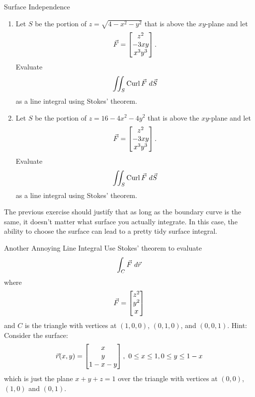 \begin{exercise}{Surface Independence}
\begin{enumerate}
\item Let $S$ be the portion of $z=\sqrt{4-x^2-y^2} $ that is above the $xy$-plane and let $$\vec{F}=\begin{bmatrix}z^2\\-3xy\\x^3y^3\end{bmatrix}.$$ Evaluate $$\iint_S \operatorname{Curl}\vec{F} \ d\vec{S} $$ as a line integral using Stokes' theorem.
\vspace{1em}
\item Let $S$ be the portion of $z=16-4x^2-4y^2 $ that is above the $xy$-plane and let $$\vec{F}=\begin{bmatrix}z^2\\-3xy\\x^3y^3\end{bmatrix}.$$ Evaluate $$\iint_S \operatorname{Curl}\vec{F} \ d\vec{S} $$ as a line integral using Stokes' theorem.
\end{enumerate}
\end{exercise}

The previous exercise should justify that as long as the boundary curve is the same, it doesn't matter what surface you actually integrate. In this case, the ability to choose the surface can lead to a pretty tidy surface integral.

\begin{pexercise}{Another Annoying Line Integral}
Use Stokes' theorem to evaluate $$\int_C\vec{F}\ d\vec{r} $$ where $$\vec{F}=\begin{bmatrix}z^2\\y^2\\x\end{bmatrix}$$ and $C$ is the triangle with vertices at $(1,0,0)$, $(0,1,0)$, and $(0,0,1)$. Hint: Consider the surface: $$\vec{r}(x,y)=\begin{bmatrix}x\\y\\1-x-y\end{bmatrix},\ 0\leq x\leq 1, 0\leq y\leq 1-x $$ which is just the plane $x+y+z=1$ over the triangle with vertices at $(0,0)$, $(1,0)$ and $(0,1)$.
\end{pexercise}
